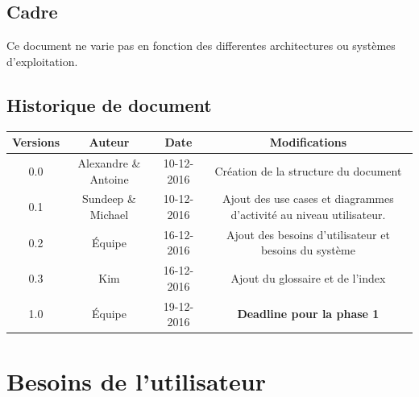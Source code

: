 \documentclass[10pt,a4paper]{article}
\begin{document}
\subsection{Cadre}

\noindent Ce document ne varie pas en fonction des differentes architectures ou systèmes d'exploitation.

\glsaddall
\printglossary[numberedsection]

\subsection{Historique de document}

\begin{center}
\hspace*{-3cm}
\begin{tabular}{|c|c|c|c|}
\hline
Versions & Auteur & Date & Modifications \\
\hline
0.0 & Alexandre \& Antoine & 10-12-2016 & Création de la structure du document\\
0.1 & Sundeep \& Michael & 10-12-2016 & Ajout des use cases et diagrammes d'activité au niveau utilisateur.\\
0.2 & Équipe & 16-12-2016 & Ajout des besoins d'utilisateur et besoins du système\\
0.3 & Kim & 16-12-2016 & Ajout du glossaire et de l'index\\
1.0 & Équipe & 19-12-2016 & \textbf{Deadline pour la phase 1}\\
\hline
\end{tabular}
\end{center}


\newpage
\section{Besoins de l'utilisateur}
\end{document}
